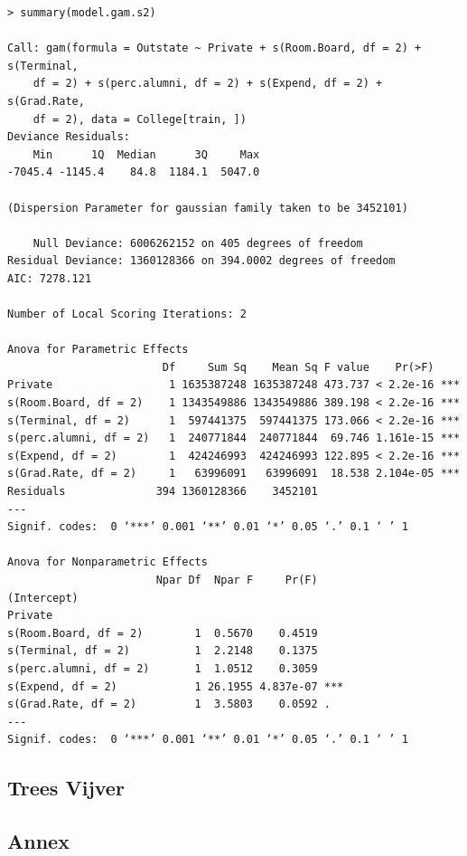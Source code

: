 \documentclass[11pt, a4paper]{article}
\begin{document}
\begin{verbatim}
> summary(model.gam.s2)

Call: gam(formula = Outstate ~ Private + s(Room.Board, df = 2) + s(Terminal, 
    df = 2) + s(perc.alumni, df = 2) + s(Expend, df = 2) + s(Grad.Rate, 
    df = 2), data = College[train, ])
Deviance Residuals:
    Min      1Q  Median      3Q     Max 
-7045.4 -1145.4    84.8  1184.1  5047.0 

(Dispersion Parameter for gaussian family taken to be 3452101)

    Null Deviance: 6006262152 on 405 degrees of freedom
Residual Deviance: 1360128366 on 394.0002 degrees of freedom
AIC: 7278.121 

Number of Local Scoring Iterations: 2 

Anova for Parametric Effects
                        Df     Sum Sq    Mean Sq F value    Pr(>F)    
Private                  1 1635387248 1635387248 473.737 < 2.2e-16 ***
s(Room.Board, df = 2)    1 1343549886 1343549886 389.198 < 2.2e-16 ***
s(Terminal, df = 2)      1  597441375  597441375 173.066 < 2.2e-16 ***
s(perc.alumni, df = 2)   1  240771844  240771844  69.746 1.161e-15 ***
s(Expend, df = 2)        1  424246993  424246993 122.895 < 2.2e-16 ***
s(Grad.Rate, df = 2)     1   63996091   63996091  18.538 2.104e-05 ***
Residuals              394 1360128366    3452101                      
---
Signif. codes:  0 ‘***’ 0.001 ‘**’ 0.01 ‘*’ 0.05 ‘.’ 0.1 ‘ ’ 1

Anova for Nonparametric Effects
                       Npar Df  Npar F     Pr(F)    
(Intercept)                                         
Private                                             
s(Room.Board, df = 2)        1  0.5670    0.4519    
s(Terminal, df = 2)          1  2.2148    0.1375    
s(perc.alumni, df = 2)       1  1.0512    0.3059    
s(Expend, df = 2)            1 26.1955 4.837e-07 ***
s(Grad.Rate, df = 2)         1  3.5803    0.0592 .  
---
Signif. codes:  0 ‘***’ 0.001 ‘**’ 0.01 ‘*’ 0.05 ‘.’ 0.1 ‘ ’ 1
\end{verbatim}
\subsection{Trees Vijver}
\label{sec-1-2}
\subsection{Annex}
\label{sec-1-3}
\end{document}
